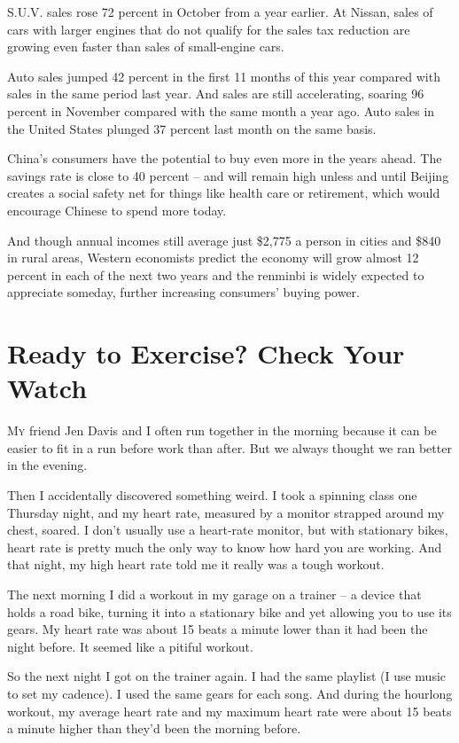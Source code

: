 ﻿\documentclass[12pt]{article}
\begin{document}
S.U.V. sales rose 72 percent in October from a year earlier. At Nissan, sales of cars with larger
engines that do not qualify for the sales tax reduction are growing even faster than sales of
small-engine cars.

Auto sales jumped 42 percent in the first 11 months of this year compared with sales in the same
period last year. And sales are still accelerating, soaring 96 percent in November compared with the
same month a year ago. Auto sales in the United States plunged 37 percent last month on the same
basis.

China's consumers have the potential to buy even more in the years ahead. The savings rate is close
to 40 percent -- and will remain high unless and until Beijing creates a social safety net for
things like health care or retirement, which would encourage Chinese to spend more today.

And though annual incomes still average just \$2,775 a person in cities and \$840 in rural areas,
Western economists predict the economy will grow almost 12 percent in each of the next two years and
the renminbi is widely expected to appreciate someday, further increasing consumers' buying power.

\section{Ready to Exercise? Check Your Watch }

\lettrine{M}{y} friend Jen Davis and I often run together in the morning
because it can be easier to fit in a run before work than after. But we always thought we ran better
in the evening.

Then I accidentally discovered something weird. I took a spinning class one Thursday night, and my
heart rate, measured by a monitor strapped around my chest, soared. I don't usually use a heart-rate
monitor, but with stationary bikes, heart rate is pretty much the only way to know how hard you are
working. And that night, my high heart rate told me it really was a tough workout.

The next morning I did a workout in my garage on a trainer -- a device that holds a road bike,
turning it into a stationary bike and yet allowing you to use its gears. My heart rate was about 15
beats a minute lower than it had been the night before. It seemed like a pitiful workout.

So the next night I got on the trainer again. I had the same playlist (I use music to set my
cadence). I used the same gears for each song. And during the hourlong workout, my average heart
rate and my maximum heart rate were about 15 beats a minute higher than they'd been the morning
before.
\end{document}
